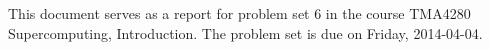 \documentclass[12pt]{simple-assignment} %
\begin{document}
\noindent
This document serves as a report for problem set 6 in the course TMA4280 Supercomputing, Introduction. The problem set is due on Friday, 2014-04-04.
\end{document}
